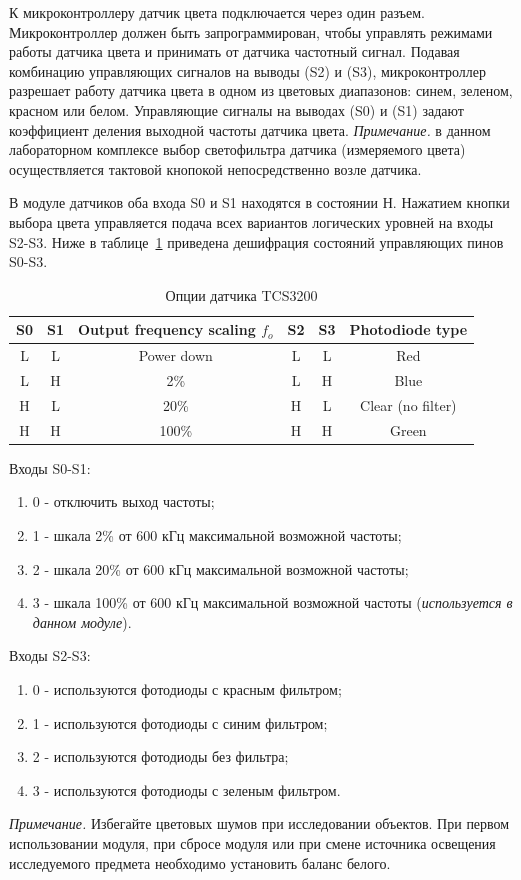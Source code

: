 \documentclass[12pt]{article}
\begin{document}
К микроконтроллеру датчик цвета подключается через один разъем. Микроконтроллер должен быть запрограммирован, чтобы управлять режимами работы датчика цвета и принимать от датчика частотный сигнал. Подавая комбинацию управляющих сигналов на выводы (S2) и (S3), микроконтроллер разрешает работу датчика цвета в одном из цветовых диапазонов: синем, зеленом, красном или белом. Управляющие сигналы на выводах (S0) и (S1) задают коэффициент деления выходной частоты датчика цвета. \textit{Примечание.} в данном лабораторном комплексе выбор светофильтра датчика (измеряемого цвета) осуществляется тактовой кнопокой непосредственно возле датчика.

В модуле датчиков оба входа S0 и S1 находятся в состоянии Н. Нажатием кнопки выбора цвета управляется подача всех вариантов логических уровней на входы S2-S3. Ниже в таблице~\ref{sensoptions} приведена дешифрация состояний управляющих пинов S0-S3.

\begin{table}[H]
    \centering
    \caption{Опции датчика TCS3200}\label{sensoptions}
    \begin{tabular}{c|c|c|c|c|c}
        \toprule
        S0 & S1 & Output frequency scaling \(f_o\) & S2 & S3 & Photodiode type \\
        \midrule
        L & L & Power down & L & L & Red \\
        L & H & 2\% & L & H & Blue \\
        H & L & 20\% & H & L & Clear (no filter) \\
        H & H & 100\% & H & H & Green \\
        \bottomrule
    \end{tabular}
\end{table}

Входы S0-S1:
\begin{enumerate}
    \def\labelenumi{\arabic{enumi})}
    \item 0 - отключить выход частоты;
    \item 1 - шкала 2\% от 600 кГц максимальной возможной частоты;
    \item 2 - шкала 20\% от 600 кГц максимальной возможной частоты;
    \item 3 - шкала 100\% от 600 кГц максимальной возможной частоты (\textit{используется в данном модуле}).
\end{enumerate}

Входы S2-S3:
\begin{enumerate}
    \def\labelenumi{\arabic{enumi})}
    \item 0 - используются фотодиоды с красным фильтром;
    \item 1 - используются фотодиоды с синим фильтром;
    \item 2 - используются фотодиоды без фильтра;
    \item 3 - используются фотодиоды с зеленым фильтром.
\end{enumerate}
\textit{Примечание.} Избегайте цветовых шумов при исследовании объектов. При первом использовании модуля, при сбросе модуля или при смене источника освещения исследуемого предмета необходимо установить баланс белого.
\end{document}
